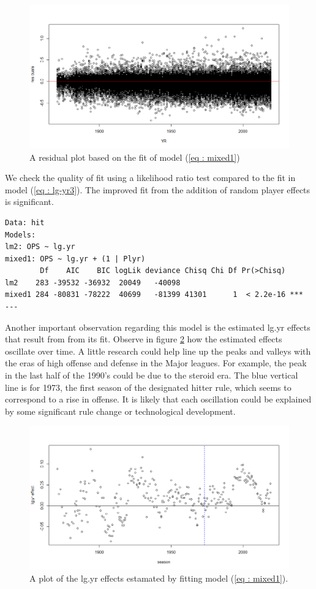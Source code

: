 \documentclass [52pt] {article}
\begin{document}
\begin{figure}[h!]
\centering
\includegraphics[scale = 0.5]{mixed1res.png}
\caption{\label{fig : mixed1res} A residual plot based on the fit of model (\ref{eq : mixed1})}
\end{figure}
We check the quality of fit using a likelihood ratio test compared to the fit in model (\ref{eq : lg-yr3}).  The improved fit from the addition of random player effects is significant.
\begin{verbatim}
Data: hit
Models:
lm2: OPS ~ lg.yr
mixed1: OPS ~ lg.yr + (1 | Plyr)
        Df    AIC    BIC logLik deviance Chisq Chi Df Pr(>Chisq)    
lm2    283 -39532 -36932  20049   -40098                            
mixed1 284 -80831 -78222  40699   -81399 41301      1  < 2.2e-16 ***
---
\end{verbatim}
Another important observation regarding this model is the estimated lg.yr effects that result from from its fit.  Observe in figure \ref{fig : lg.yr_effs_mixed1} how the estimated effects oscillate over time.  A little research could help line up the peaks and valleys with the eras of high offense and defense in the Major leagues.  For example, the peak in the last half of the 1990's could be due to the steroid era.  The blue vertical line is for 1973, the first season of the designated hitter rule, which seems to correspond to a rise in offense.  It is likely that each oscillation could be explained by some significant rule change or technological development.

\begin{figure}[h!]
\centering
\includegraphics[scale = 0.5]{lg.yr_effs_mixed1.png}
\caption{\label{fig : lg.yr_effs_mixed1} A plot of the lg.yr effects estamated by fitting model (\ref{eq : mixed1}).}
\end{figure}
\end{document}
